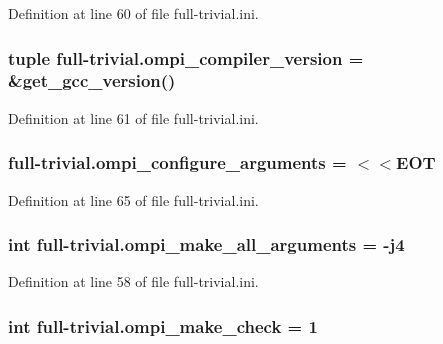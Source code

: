 Definition at line 60 of file full-\/trivial.\-ini.

\hypertarget{namespacefull-trivial_ae61160048d266c12c817f0c990b0b41b}{
\subsubsection[{ompi\-\_\-compiler\-\_\-version}]{\setlength{\rightskip}{0pt plus 5cm}tuple full-\/trivial.\-ompi\-\_\-compiler\-\_\-version = \&get\-\_\-gcc\-\_\-version()}}\label{namespacefull-trivial_ae61160048d266c12c817f0c990b0b41b}


Definition at line 61 of file full-\/trivial.\-ini.

\hypertarget{namespacefull-trivial_ad846b3615dd310ecef321a446f558151}{
\subsubsection[{ompi\-\_\-configure\-\_\-arguments}]{\setlength{\rightskip}{0pt plus 5cm}full-\/trivial.\-ompi\-\_\-configure\-\_\-arguments = $<$$<$E\-O\-T}}\label{namespacefull-trivial_ad846b3615dd310ecef321a446f558151}


Definition at line 65 of file full-\/trivial.\-ini.

\hypertarget{namespacefull-trivial_a5a973d684d1c8c9442df7cd698a3cd03}{
\subsubsection[{ompi\-\_\-make\-\_\-all\-\_\-arguments}]{\setlength{\rightskip}{0pt plus 5cm}int full-\/trivial.\-ompi\-\_\-make\-\_\-all\-\_\-arguments = -\/j4}}\label{namespacefull-trivial_a5a973d684d1c8c9442df7cd698a3cd03}


Definition at line 58 of file full-\/trivial.\-ini.

\hypertarget{namespacefull-trivial_a84b104cbca5b5b6e7d726de01ad3947f}{
\subsubsection[{ompi\-\_\-make\-\_\-check}]{\setlength{\rightskip}{0pt plus 5cm}int full-\/trivial.\-ompi\-\_\-make\-\_\-check = 1}}\label{namespacefull-trivial_a84b104cbca5b5b6e7d726de01ad3947f}


